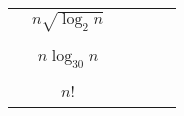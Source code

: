 \documentclass[12pt,twoside]{article}
\begin{document}
\begin{problem}{20}
\begin{center}
\begin{tabular}{|c|c||c|c|c|c|}
& $n\sqrt{\log_2 n}$    &                 &                 &       &         \\
&                    &                 &                 &             &   \\
\cline{2-6}
&                    & \hspace*{1.0in} & \hspace*{1.0in} & \hspace*{1.0in} &\\
& $n \log_{30} n$  &                 &                 &              &  \\
&                    &                 &                 &              &  \\
\cline{2-6}
&                    & \hspace*{1.0in} & \hspace*{1.0in} & \hspace*{1.0in}&\\
& $n!$               &                 &                 &             &   \\
&                    &                 &                 &             &   \\
\hline
\end{tabular}
\end{center}
\fi


\end{problem}
\end{document}
